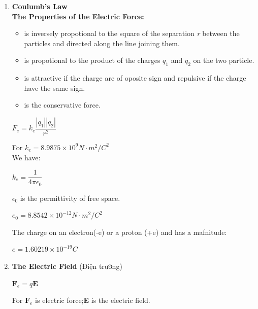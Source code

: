 \documentclass[10pt]{article}
\begin{document}
\begin{enumerate}
	\item \textbf{Coulumb's Law}\\
	\textbf{The Properties of the Electric Force:}
	\begin{itemize}
		\item is inversely propotional to the square of the separation \textit{r} between the particles and directed along the line joining them.
		\item is propotional to the product of the charges \textit{$q_1$} and \textit{$q_2$} on the two particle.
		\item is attractive if the charge are of oposite sign and repulsive if the charge have the same sign.
		\item is the conservative force.
	\end{itemize}
	\begin{mybox}
	\begin{center}
	$F_e = k_e \dfrac{|q_1||q_2|}{r^2}$
	\end{center}
	\end{mybox}
	For $k_e = 8.9875 \times 10^9 N \cdot m^2/C^2$\\
	We have:
	\begin{mybox}
	\begin{center}
	$k_e = \dfrac{1}{4 \pi \epsilon_0}$
	\end{center}
	\end{mybox}
	$\epsilon_0$ is the permittivity of free space.
	\begin{center}
	$\textit{e}_0 = 8.8542 \times 10^{-12} N \cdot m^2 /C^2$
	\end{center}
	The charge on an electron(-e) or a proton (+e) and has a mafnitude:
	\begin{center}
	$\textit{e} = 1.60219 \times 10^{-19} C$
	\end{center}
	\item \textbf{The Electric Field} (Điện trường)\\
	\begin{mybox}
	\begin{center}
	$\textbf{F}_e = q \textbf{E}$
	\end{center}
	\end{mybox}
	For $\textbf{F}_e$ is electric force;\textbf{E} is the electric field.\\
\end{enumerate} 
\end{document}
